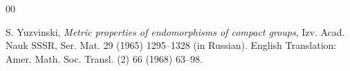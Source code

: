 \documentclass[11pt]{article}
\theoremstyle{definition}
\numberwithin{equation}{section}
\begin{document}
\begin{thebibliography}{00}
{%



 S. Yuzvinski, \emph{Metric properties of endomorphisms of compact groups}, Izv. Acad. Nauk SSSR, Ser. Mat. {29} (1965) 1295--1328 (in Russian). English Translation: Amer. Math. Soc. Transl. (2) {66} (1968) 63--98.

}

\end{thebibliography}
\end{document}
